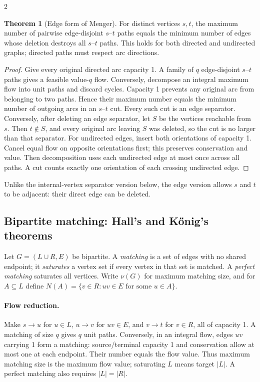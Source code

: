 \documentclass[10pt]{article}
\theoremstyle{definition}
\newtheorem{theorem}[definition]{Theorem}
\begin{document}
\begin{multicols*}{2}
\begin{theorem}[Edge form of Menger]\label{nf:edge-menger}
For distinct vertices $s,t$, the maximum number of pairwise edge-disjoint
$s$--$t$ paths equals the minimum number of edges whose deletion destroys
all $s$--$t$ paths. This holds for both directed and undirected graphs;
directed paths must respect arc directions.
\end{theorem}
\begin{proof}
Give every original directed arc capacity 1. A family of $q$ edge-disjoint
$s$--$t$ paths gives a feasible value-$q$ flow. Conversely, decompose an
integral maximum flow into unit paths and discard cycles. Capacity 1 prevents
any original arc from belonging to two paths. Hence their maximum number
equals the minimum number of outgoing arcs in an $s$--$t$ cut.
Every such cut is an edge separator. Conversely, after deleting an edge
separator, let $S$ be the vertices reachable from $s$. Then $t\notin S$,
and every original arc leaving $S$ was deleted, so the cut is no larger
than that separator.
For undirected edges, insert both orientations of capacity 1. Cancel equal
flow on opposite orientations first; this preserves conservation and value.
Then decomposition uses each undirected edge at most once across all paths.
A cut counts exactly one orientation of each crossing undirected edge.
\end{proof}
Unlike the internal-vertex separator version below, the edge version allows
$s$ and $t$ to be adjacent: their direct edge can be deleted.

\subsection{Bipartite matching: Hall's and K\H{o}nig's theorems}\label{nf:matching}
Let $G=(L\cup R,E)$ be bipartite. A \emph{matching} is a set of edges with
no shared endpoint; it \emph{saturates} a vertex set if every vertex in that
set is matched. A \emph{perfect matching} saturates all vertices.
Write $\nu(G)$ for maximum matching size, and for $A\subseteq L$ define
$N(A)=\{v\in R:uv\in E\text{ for some }u\in A\}$.

\paragraph{Flow reduction.}
Make $s\to u$ for $u\in L$, $u\to v$ for $uv\in E$, and $v\to t$ for
$v\in R$, all of capacity 1. A matching of size $q$ gives $q$ unit paths.
Conversely, in an integral flow, edges $uv$ carrying 1 form a matching:
source/terminal capacity 1 and conservation allow at most one at each
endpoint. Their number equals the flow value. Thus maximum matching size is
the maximum flow value; saturating $L$ means target $|L|$. A perfect
matching also requires $|L|=|R|$.


\end{multicols*}
\end{document}
